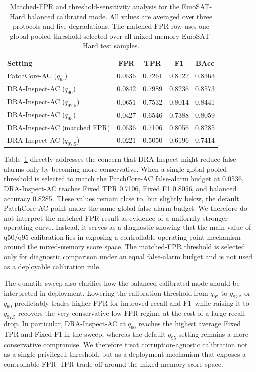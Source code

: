 \documentclass[remotesensing,article,submit,pdftex,moreauthors]{Definitions/mdpi}
\begin{document}
\begin{table}[!htbp]
\caption{Matched-FPR and threshold-sensitivity analysis for the EuroSAT-Hard balanced calibrated mode. All values are averaged over three protocols and five degradations. The matched-FPR row uses one global pooled threshold selected over all mixed-memory EuroSAT-Hard test samples.}
\label{tab:eurosat-hard-threshold-sensitivity}
\centering
\small
\setlength{\tabcolsep}{4pt}
\begin{tabular}{lcccc}
\hline
Setting & FPR & TPR & F1 & BAcc \\
\hline
PatchCore-AC ($q_{95}$) & 0.0536 & 0.7261 & 0.8122 & 0.8363 \\
DRA-Inspect-AC ($q_{90}$) & 0.0842 & 0.7989 & 0.8236 & 0.8573 \\
DRA-Inspect-AC ($q_{92.5}$) & 0.0651 & 0.7532 & 0.8014 & 0.8441 \\
DRA-Inspect-AC ($q_{95}$) & 0.0427 & 0.6546 & 0.7388 & 0.8059 \\
DRA-Inspect-AC (matched FPR) & 0.0536 & 0.7106 & 0.8056 & 0.8285 \\
DRA-Inspect-AC ($q_{97.5}$) & 0.0221 & 0.5050 & 0.6196 & 0.7414 \\
\hline
\end{tabular}
\end{table}

\noindent Table~\ref{tab:eurosat-hard-threshold-sensitivity} directly addresses the concern that DRA-Inspect might reduce false alarms only by becoming more conservative. When a single global pooled threshold is selected to match the PatchCore-AC false-alarm budget at 0.0536, DRA-Inspect-AC reaches Fixed TPR 0.7106, Fixed F1 0.8056, and balanced accuracy 0.8285. These values remain close to, but slightly below, the default PatchCore-AC point under the same global false-alarm budget. We therefore do not interpret the matched-FPR result as evidence of a uniformly stronger operating curve. Instead, it serves as a diagnostic showing that the main value of q50/q95 calibration lies in exposing a controllable operating-point mechanism around the mixed-memory score space. The matched-FPR threshold is selected only for diagnostic comparison under an equal false-alarm budget and is not used as a deployable calibration rule.

\noindent The quantile sweep also clarifies how the balanced calibrated mode should be interpreted in deployment. Lowering the calibration threshold from $q_{95}$ to $q_{92.5}$ or $q_{90}$ predictably trades higher FPR for improved recall and F1, while raising it to $q_{97.5}$ recovers the very conservative low-FPR regime at the cost of a large recall drop. In particular, DRA-Inspect-AC at $q_{90}$ reaches the highest average Fixed TPR and Fixed F1 in the sweep, whereas the default $q_{95}$ setting remains a more conservative compromise. We therefore treat corruption-agnostic calibration not as a single privileged threshold, but as a deployment mechanism that exposes a controllable FPR--TPR trade-off around the mixed-memory score space.
\end{document}
